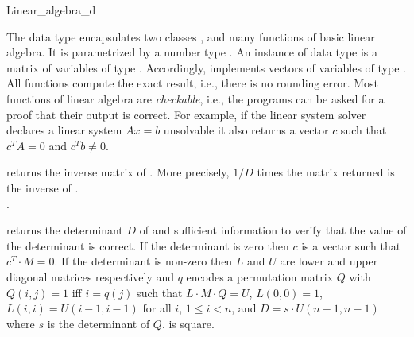 
\begin{ccRefConcept}{Linear_algebra_d}

\ccDefinition


The data type  encapsulates two classes
,  and many functions of basic linear algebra.
It is parametrized by a number type . An instance of data type
 is a matrix of variables of type . Accordingly,
 implements vectors of variables of type .  All
functions compute the exact result, i.e., there is no rounding error.
Most functions of linear algebra are \emph{checkable}, i.e., the
programs can be asked for a proof that their output is correct. For
example, if the linear system solver declares a linear system $A x =
b$ unsolvable it also returns a vector $c$ such that $c^T A = 0$ and
$c^T b \neq 0$.


\ccSetOneOfTwoColumns{5.5cm}
\ccTypes


\ccSetTwoOfThreeColumns{2cm}{1cm}

\ccOperations



%
{returns the inverse matrix of . More precisely, $1/D$ 
            times the matrix returned is the inverse of .\\
            \ccPrecond  {}.  
}

%
{returns the determinant $D$ of  and sufficient information 
            to verify that the value of the determinant is correct. If 
            the determinant is zero then $c$ is a vector such that 
            $c^T \cdot M = 0$. If the determinant is non-zero then $L$ 
            and $U$ are lower and upper diagonal matrices respectively 
            and $q$ encodes a permutation matrix $Q$ with $Q(i,j) = 1$ 
            iff $i = q(j)$ such that $L \cdot M \cdot Q = U$, 
            $L(0,0) = 1$, $L(i,i) = U(i - 1,i - 1)$ for all $i$, 
            $1 \le i < n$, and $D = s \cdot U(n - 1,n - 1)$ where $s$ is 
            the determinant of $Q$. \ccPrecond  {} is square.  
}


\end{ccRefConcept}
